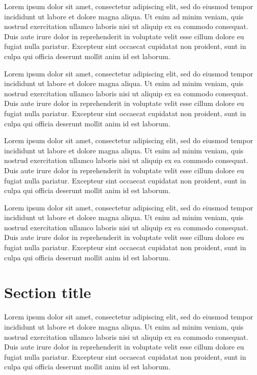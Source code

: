 Lorem ipsum dolor sit amet, consectetur adipiscing elit, sed do eiusmod tempor incididunt ut labore et dolore magna aliqua. Ut enim ad minim veniam, quis nostrud exercitation ullamco laboris nisi ut aliquip ex ea commodo consequat. Duis aute irure dolor in reprehenderit in voluptate velit esse cillum dolore eu fugiat nulla pariatur. Excepteur sint occaecat cupidatat non proident, sunt in culpa qui officia deserunt mollit anim id est laborum.

Lorem ipsum dolor sit amet, consectetur adipiscing elit, sed do eiusmod tempor incididunt ut labore et dolore magna aliqua. Ut enim ad minim veniam, quis nostrud exercitation ullamco laboris nisi ut aliquip ex ea commodo consequat. Duis aute irure dolor in reprehenderit in voluptate velit esse cillum dolore eu fugiat nulla pariatur. Excepteur sint occaecat cupidatat non proident, sunt in culpa qui officia deserunt mollit anim id est laborum.

Lorem ipsum dolor sit amet, consectetur adipiscing elit, sed do eiusmod tempor incididunt ut labore et dolore magna aliqua. Ut enim ad minim veniam, quis nostrud exercitation ullamco laboris nisi ut aliquip ex ea commodo consequat. Duis aute irure dolor in reprehenderit in voluptate velit esse cillum dolore eu fugiat nulla pariatur. Excepteur sint occaecat cupidatat non proident, sunt in culpa qui officia deserunt mollit anim id est laborum.

Lorem ipsum dolor sit amet, consectetur adipiscing elit, sed do eiusmod tempor incididunt ut labore et dolore magna aliqua. Ut enim ad minim veniam, quis nostrud exercitation ullamco laboris nisi ut aliquip ex ea commodo consequat. Duis aute irure dolor in reprehenderit in voluptate velit esse cillum dolore eu fugiat nulla pariatur. Excepteur sint occaecat cupidatat non proident, sunt in culpa qui officia deserunt mollit anim id est laborum.


\section{Section title}
Lorem ipsum dolor sit amet, consectetur adipiscing elit, sed do eiusmod tempor incididunt ut labore et dolore magna aliqua. Ut enim ad minim veniam, quis nostrud exercitation ullamco laboris nisi ut aliquip ex ea commodo consequat. Duis aute irure dolor in reprehenderit in voluptate velit esse cillum dolore eu fugiat nulla pariatur. Excepteur sint occaecat cupidatat non proident, sunt in culpa qui officia deserunt mollit anim id est laborum.


